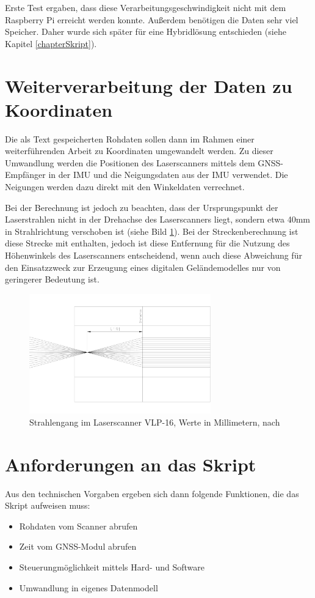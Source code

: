 \documentclass[a4paper,12pt,bibliography=totoc, listof=totoc,titlepage]{scrreprt}
\begin{document}
Erste Test ergaben, dass diese Verarbeitungsgeschwindigkeit nicht mit dem Raspberry Pi erreicht werden konnte. Außerdem benötigen die Daten sehr viel Speicher. Daher wurde sich später für eine Hybridlösung entschieden (siehe Kapitel \ref{chapterSkript}).

\section{Weiterverarbeitung der Daten zu Koordinaten}
Die als Text gespeicherten Rohdaten sollen dann im Rahmen einer weiterführenden Arbeit zu Koordinaten umgewandelt werden. Zu dieser Umwandlung werden die Positionen des Laserscanners mittels dem GNSS-Empfänger in der IMU und die Neigungsdaten aus der IMU verwendet. Die Neigungen werden dazu direkt mit den Winkeldaten verrechnet.

Bei der Berechnung ist jedoch zu beachten, dass der Ursprungspunkt der Laserstrahlen nicht in der Drehachse des Laserscanners liegt, sondern etwa 40mm in Strahlrichtung verschoben ist (siehe Bild \ref{img:strahlengang}). Bei der Streckenberechnung ist diese Strecke mit enthalten, jedoch ist diese Entfernung für die Nutzung des Höhenwinkels des Laserscanners entscheidend, wenn auch diese Abweichung für den Einsatzzweck zur Erzeugung eines digitalen Geländemodelles nur von geringerer Bedeutung ist.

\begin{figure}[ht!]
 \centering
 \includegraphics[width=0.7\textwidth]{./img/Strahlengang.png}
 \caption{Strahlengang im Laserscanner VLP-16, Werte in Millimetern, nach 
\citet{vlpCAD}}
 \label{img:strahlengang}
\end{figure}

\section{Anforderungen an das Skript}
Aus den technischen Vorgaben ergeben sich dann folgende Funktionen, die das Skript aufweisen muss:
\begin{itemize}
 \item Rohdaten vom Scanner abrufen
 \item Zeit vom GNSS-Modul abrufen
 \item Steuerungmöglichkeit mittels Hard- und Software
 \item Umwandlung in eigenes Datenmodell
\end{itemize}
\end{document}
